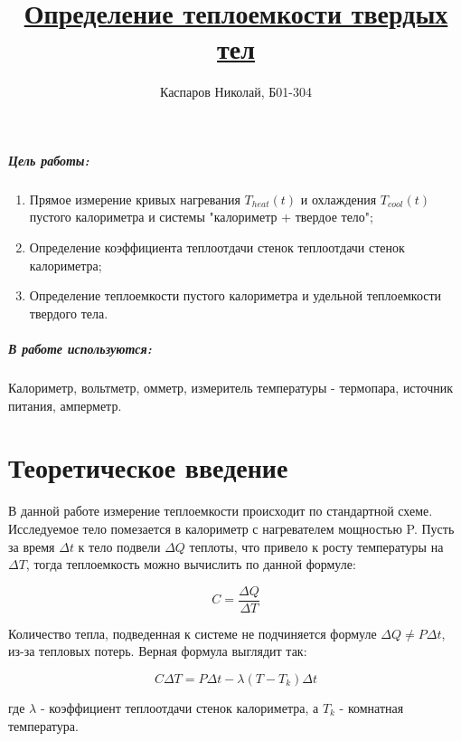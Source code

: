 \documentclass[a4paper]{article}
\title{\underline{Определение теплоемкости твердых тел}}
\author{Каспаров Николай, Б01-304}
\begin{document}
\maketitle
\begin{center}
\Large{\textbf{ }}
\end{center}

\subparagraph{Цель работы:}

\begin{enumerate}
    \item Прямое измерение кривых нагревания $T_{heat}(t)$
        и охлаждения $T_{cool}(t)$ пустого калориметра и системы 
        "калориметр + твердое тело";

    \item Определение коэффициента теплоотдачи стенок теплоотдачи стенок калориметра;

    \item Определение теплоемкости пустого калориметра и удельной теплоемкости твердого тела.

\end{enumerate}

\subparagraph{В работе используются:}

Калориметр, вольтметр, омметр, измеритель температуры - термопара,
источник питания, амперметр.

\section{Теоретическое введение}

В данной работе измерение теплоемкости происходит по стандартной схеме.
Исследуемое тело помезается в калориметр с нагревателем мощностью P.
Пусть за время $\Delta t$ к тело подвели $\Delta Q$ теплоты,
что привело к росту температуры на $\Delta T$,
тогда теплоемкость можно вычислить по данной формуле:

\begin{equation}
    C = \frac{\Delta Q}{\Delta T}
\end{equation}

Количество тепла, подведенная к системе не подчиняется формуле
$ \Delta Q \neq P \Delta t$, из-за тепловых потерь.
Верная формула выглядит так:

\begin{equation}
    C \Delta T = P \Delta t - \lambda \left( T - T_k \right) \Delta t
\label{eq:main}
\end{equation}

где $\lambda$ - коэффициент теплоотдачи стенок калориметра,
а $T_k$ - комнатная температура.
\end{document}
